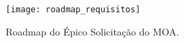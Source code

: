 \begin{figure}[H]
	\centering
	\texttt{[image: roadmap\_requisitos]}
	\caption[Roadmap do Épico Solicitação do MOA]{Roadmap do Épico Solicitação do MOA.}
	\label{fig:roadmap}
\end{figure}